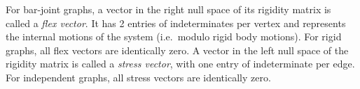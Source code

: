 




For bar-joint graphs,  
a vector  in the right null space of its rigidity matrix
is called a {\em flex vector}. 
It has 2 entries of indeterminates per vertex and represents the internal motions of the system
(i.e.\ modulo rigid body motions).
For rigid graphs, all flex vectors are  identically zero. 
A vector in the left null space of the rigidity matrix
is called a {\em stress vector}, with one entry of indeterminate per edge.
For independent graphs, all stress vectors are identically zero. 





